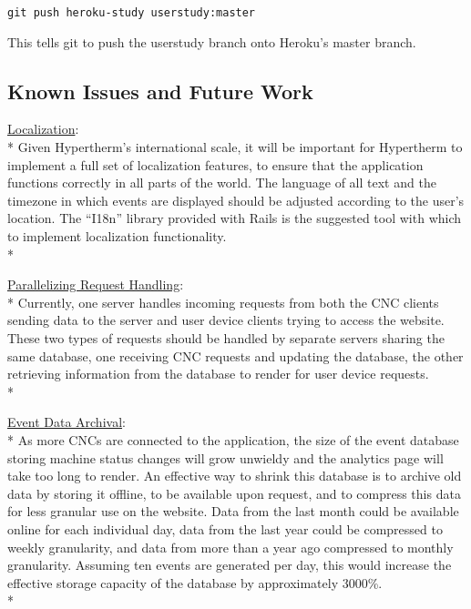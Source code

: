 \documentclass[12pt,letterpaper,titlepage]{article}
\begin{document}
\begin{lstlisting}
git push heroku-study userstudy:master
\end{lstlisting}

This tells git to push the userstudy branch onto Heroku's master branch.

\subsection{Known Issues and Future Work} \label{doc:KnowIssuesandFutureWork}

\underline{Localization}:\\*
Given Hypertherm's international scale, it will be important for Hypertherm to implement a full set of localization features, to ensure that the application functions correctly in all parts of the world. The language of all text and the timezone in which events are displayed should be adjusted according to the user's location. The ``I18n'' library provided with Rails is the suggested tool with which to implement localization functionality.\\*

\noindent\underline{Parallelizing Request Handling}:\\*
Currently, one server handles incoming requests from both the CNC clients sending data to the server and user device clients trying to access the website. These two types of requests should be handled by separate servers sharing the same database, one receiving CNC requests and updating the database, the other retrieving information from the database to render for user device requests. \\*

\noindent\underline{Event Data Archival}:\\*
As more CNCs are connected to the application, the size of the event database storing machine status changes will grow unwieldy and the analytics page will take too long to render. An effective way to shrink this database is to archive old data by storing it offline, to be available upon request, and to compress this data for less granular use on the website. Data from the last month could be available online for each individual day, data from the last year could be compressed to weekly granularity, and data from more than a year ago compressed to monthly granularity. Assuming ten events are generated per day, this would increase the effective storage capacity of the database by approximately 3000\%.\\*
\end{document}
